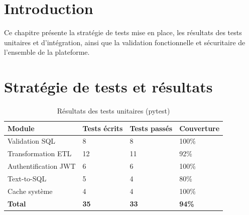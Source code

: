 \documentclass[a4paper,12pt]{report}
\begin{document}
\section*{Introduction}
\begin{doublespace}
Ce chapitre présente la stratégie de tests mise en place, les résultats des tests unitaires et d'intégration, ainsi que la validation fonctionnelle et sécuritaire de l'ensemble de la plateforme.
\end{doublespace}

\section{Stratégie de tests et résultats}
\begin{doublespace}
\begin{table}[H]
\centering
\begin{tabular}{|p{4cm}|p{3cm}|p{3cm}|p{3cm}|}
    \hline
    \textbf{Module} & \textbf{Tests écrits} & \textbf{Tests passés} & \textbf{Couverture} \\
    \hline
    Validation SQL & 8 & 8 & 100\% \\
    \hline
    Transformation ETL & 12 & 11 & 92\% \\
    \hline
    Authentification JWT & 6 & 6 & 100\% \\
    \hline
    Text-to-SQL & 5 & 4 & 80\% \\
    \hline
    Cache système & 4 & 4 & 100\% \\
    \hline
    \textbf{Total} & \textbf{35} & \textbf{33} & \textbf{94\%} \\
    \hline
\end{tabular}
\caption{Résultats des tests unitaires (pytest)}
\label{tab:unit_tests}
\end{table}


\end{doublespace}
\end{document}
